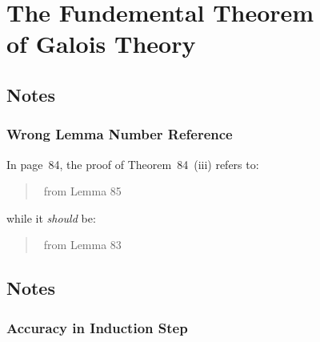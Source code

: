 \chapter[The Fundemental Theorem]{%
        The Fundemental Theorem \\ of Galois Theory}

\section{Notes}

\subsection{Wrong Lemma Number Reference}

In page~84, the proof of Theorem~84~(iii) refers to:
\begin{quotation}
 \mldots\ from Lemma 85 \mldots
\end{quotation}
while it \emph{should} be:
\begin{quotation}
 \mldots\ from Lemma 83 \mldots
\end{quotation}


\section{Notes}

\subsection{Accuracy in Induction Step}

